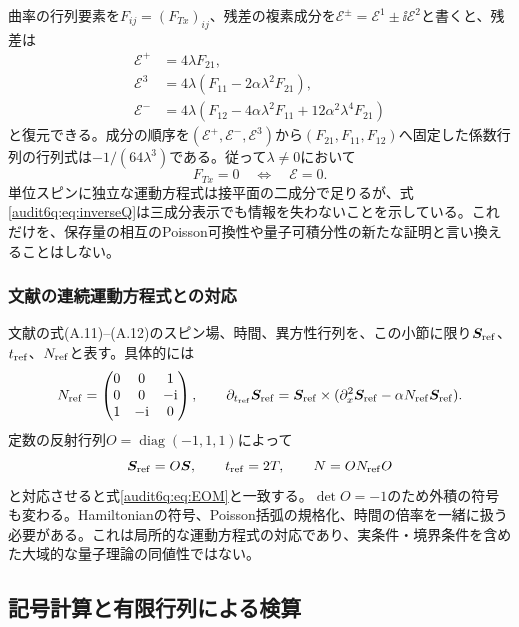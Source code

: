 曲率の行列要素を$F_{ij}=(F_{Tx})_{ij}$、残差の複素成分を$\mathcal E^\pm=\mathcal E^1\pm\ii\mathcal E^2$と書くと、残差は
\begin{align}
\mathcal E^+&=4\lambda F_{21},\nonumber\\
\mathcal E^3&=4\lambda(F_{11}-2\alpha\lambda^2F_{21}),\nonumber\\
\mathcal E^-&=4\lambda(F_{12}-4\alpha\lambda^2F_{11}+12\alpha^2\lambda^4F_{21})
\label{audit6q:eq:inverseQ}
\end{align}
と復元できる。成分の順序を$(\mathcal E^+,\mathcal E^-,\mathcal E^3)$から$(F_{21},F_{11},F_{12})$へ固定した係数行列の行列式は$-1/(64\lambda^3)$である。従って$\lambda\ne0$において
\begin{equation}
F_{Tx}=0\quad\Longleftrightarrow\quad\boldsymbol{\mathcal E}=0.
\label{audit6q:eq:equivalence}
\end{equation}
単位スピンに独立な運動方程式は接平面の二成分で足りるが、式\eqref{audit6q:eq:inverseQ}は三成分表示でも情報を失わないことを示している。これだけを、保存量の相互のPoisson可換性や量子可積分性の新たな証明と言い換えることはしない。

\subsubsection{文献の連続運動方程式との対応}
文献\cite{DFN}の式(A.11)--(A.12)のスピン場、時間、異方性行列を、この小節に限り$\boldsymbol S_{\rm ref}$、$t_{\rm ref}$、$N_{\rm ref}$と表す。具体的には
\begin{equation}
N_{\rm ref}=\begin{pmatrix}0&0&1\\0&0&-\mathrm i\\1&-\mathrm i&0\end{pmatrix},\qquad
\partial_{t_{\rm ref}}\boldsymbol S_{\rm ref}
=\boldsymbol S_{\rm ref}\times(\partial_x^2\boldsymbol S_{\rm ref}-\alpha N_{\rm ref}\boldsymbol S_{\rm ref}).
\label{audit6q:eq:refEOM}
\end{equation}
定数の反射行列$O=\operatorname{diag}(-1,1,1)$によって
\begin{equation}
\boldsymbol S_{\rm ref}=O\boldsymbol S,\qquad t_{\rm ref}=2T,\qquad
N=O N_{\rm ref} O
\label{audit6q:eq:dictionary}
\end{equation}
と対応させると式\eqref{audit6q:eq:EOM}と一致する。$\det O=-1$のため外積の符号も変わる。Hamiltonianの符号、Poisson括弧の規格化、時間の倍率を一緒に扱う必要がある。これは局所的な運動方程式の対応であり、実条件・境界条件を含めた大域的な量子理論の同値性ではない。

\subsection{記号計算と有限行列による検算}
